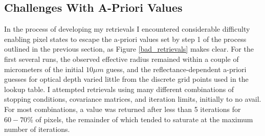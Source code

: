 \documentclass[12pt]{article}
\begin{document}
\subsection{Challenges With A-Priori Values}

In the process of developing my retrievals I encountered considerable difficulty enabling pixel states to escape the a-priori values set by step 1 of the process outlined in the previous section, as Figure \ref{bad_retrievals} makes clear. For the first several runs, the observed effective radius remained within a couple of micrometers of the initial $10\mu m$ guess, and the reflectance-dependent a-priori guesses for optical depth varied little from the discrete grid points used in the lookup table. I attempted retrievals using many different combinations of stopping conditions, covariance matrices, and iteration limits, initially to no avail. For most combinations, a value was returned after less than 5 iterations for $60-70\%$ of pixels, the remainder of which tended to saturate at the maximum number of iterations.
\end{document}
